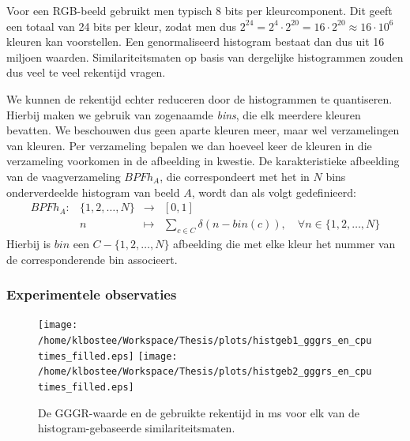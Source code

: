 Voor een RGB-beeld gebruikt men typisch 8 bits per kleurcomponent. Dit geeft een totaal van
24 bits per kleur, zodat men dus $2^{24}=2^4 \cdot 2^{20}=16 \cdot 2^{20} \approx 16 \cdot 10^6$
kleuren kan voorstellen. Een genormaliseerd histogram bestaat dan dus uit 16 miljoen waarden.
Similariteitsmaten op basis van dergelijke histogrammen zouden dus veel te veel rekentijd vragen.

We kunnen de rekentijd echter reduceren door de histogrammen te quantiseren. Hierbij
maken we gebruik van zogenaamde \emph{bins}, die elk meerdere kleuren bevatten. We beschouwen dus 
geen aparte kleuren meer, maar wel verzamelingen van kleuren. Per verzameling bepalen we dan 
hoeveel keer de kleuren in die verzameling voorkomen 
in de afbeelding in kwestie. De karakteristieke afbeelding van de vaagverzameling $\mathit{BPFh}_A$, die
correspondeert met het in $N$ bins onderverdeelde histogram van beeld $A$, wordt dan als volgt
gedefinieerd:  
$$
\begin{array}{lrcl}
\mathit{BPFh}_A: 	& \{1,2,\ldots,N\} 	& \to 		& [0,1] \\[5pt]
		& n						& \mapsto	& \displaystyle\sum_{c \in C} \delta (n -  bin(c)),
\quad\forall n \in \{1,2,\ldots,N\}
\end{array}
$$
Hierbij is $bin$ een $C - \{1,2,\ldots,N\}$ afbeelding die met elke kleur het nummer van de 
corresponderende bin associeert. 




\subsubsection{Experimentele observaties}


\begin{figure}[tbp]
\begin{center}
\texttt{[image: /home/klbostee/Workspace/Thesis/plots/histgeb1\_gggrs\_en\_cputimes\_filled.eps]}
\texttt{[image: /home/klbostee/Workspace/Thesis/plots/histgeb2\_gggrs\_en\_cputimes\_filled.eps]}
\caption{\label{fig:histgeb_gggrs_en_cputimes}De GGGR-waarde en de gebruikte rekentijd in ms voor elk van de histogram-gebaseerde similariteitsmaten.}
\end{center}
\end{figure}

